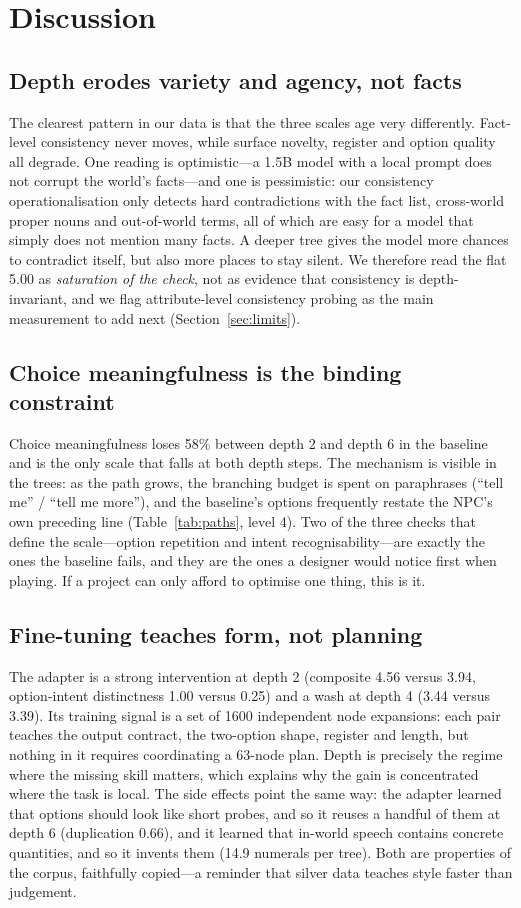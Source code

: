 \documentclass[conference]{IEEEtran}
\begin{document}
\section{Discussion}
\subsection{Depth erodes variety and agency, not facts}
The clearest pattern in our data is that the three scales age very differently. Fact-level
consistency never moves, while surface novelty, register and option quality all degrade. One
reading is optimistic---a 1.5B model with a local prompt does not corrupt the world's facts---and
one is pessimistic: our consistency operationalisation only detects hard contradictions with the
fact list, cross-world proper nouns and out-of-world terms, all of which are easy for a model that
simply does not mention many facts. A deeper tree gives the model more chances to contradict
itself, but also more places to stay silent. We therefore read the flat 5.00 as \emph{saturation of
the check}, not as evidence that consistency is depth-invariant, and we flag attribute-level
consistency probing as the main measurement to add next (Section~\ref{sec:limits}).

\subsection{Choice meaningfulness is the binding constraint}
Choice meaningfulness loses 58\% between depth 2 and depth 6 in the baseline and is the only scale
that falls at both depth steps. The mechanism is visible in the trees: as the path grows, the
branching budget is spent on paraphrases (``tell me'' / ``tell me more''), and the baseline's
options frequently restate the NPC's own preceding line (Table~\ref{tab:paths}, level 4). Two of the
three checks that define the scale---option repetition and intent recognisability---are exactly the
ones the baseline fails, and they are the ones a designer would notice first when playing. If a
project can only afford to optimise one thing, this is it.

\subsection{Fine-tuning teaches form, not planning}
The adapter is a strong intervention at depth 2 (composite 4.56 versus 3.94, option-intent
distinctness 1.00 versus 0.25) and a wash at depth 4 (3.44 versus 3.39). Its training signal is a
set of 1600 independent node expansions: each pair teaches the output contract, the two-option
shape, register and length, but nothing in it requires coordinating a 63-node plan. Depth is
precisely the regime where the missing skill matters, which explains why the gain is concentrated
where the task is local. The side effects point the same way: the adapter learned that options
should look like short probes, and so it reuses a handful of them at depth 6 (duplication 0.66), and
it learned that in-world speech contains concrete quantities, and so it invents them (14.9
numerals per tree). Both are properties of the corpus, faithfully copied---a reminder that silver
data teaches style faster than judgement.
\end{document}
